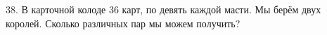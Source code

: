 38. В карточной колоде 36 карт, по девять каждой масти. Мы берём двух королей. Сколько различных пар мы можем получить?\\
